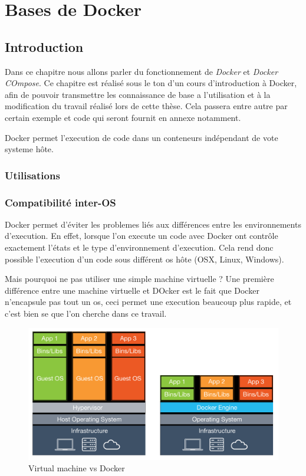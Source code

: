 \chapter{Bases de Docker}
\label{ch:docker}

\section{Introduction}
Dans ce chapitre nous allons parler du fonctionnement de \emph{Docker} et \emph{Docker COmpose}. Ce chapitre est réalisé sous le ton d'un cours d'introduction à Docker, afin de pouvoir transmettre les connaissance de base a l'utilisation et à la modification du travail réalisé lors de cette thèse. Cela passera entre autre par certain exemple et code qui seront fournit en annexe notamment.

Docker permet l'execution de code dans un conteneurs indépendant de vote systeme hôte. 

\subsection{Utilisations}
\subsection{Compatibilité inter-OS}
Docker permet d'éviter les problemes liés aux différences entre les environnements d'execution. En effet, lorsque l'on execute un code avec Docker ont contrôle exactement l'états et le type d'environnement d'execution. Cela rend donc possible l'execution d'un code sous différent \gls{os} hôte (OSX, Linux, Windows).

Mais pourquoi ne pas utiliser une simple machine virtuelle ? Une première différence entre une machine virtuelle et DOcker est le fait que Docker n'encapsule pas tout un \gls{os}, ceci permet une execution beaucoup plus rapide, et c'est bien se que l'on cherche dans ce travail.

\begin{figure}[H] 
\centering 
\includegraphics[width=1\columnwidth]{img/vm-vs-docker-container} 
\caption[vm vs Docker]{Virtual machine vs Docker}
\label{fig:vs} 
\end{figure}

